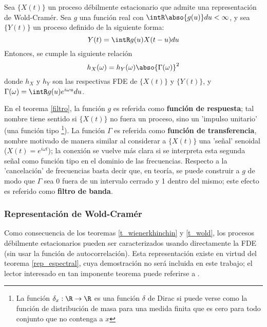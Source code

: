 \begin{thrm}
Sea $\{ X(t) \}$ un proceso d\'ebilmente estacionario que admite una representaci\'on de 
Wold-Cram\'er. Sea $g$ una funci\'on real con $\intR \abso{g(u)} du < \infty$, y sea $\{ Y(t) \}$ 
un proceso definido de la siguiente forma:
\begin{equation*}
Y(t) = \intR g(u) X(t-u) du
\end{equation*}
Entonces, se cumple la siguiente relaci\'on
\begin{equation*}
h_X(\omega) = h_Y(\omega) \abso{\Gamma(\omega)}^{2}
\end{equation*}
donde $h_X$ y $h_Y$ son las respectivas FDE de $\{X(t)\}$ y $\{Y(t)\}$, y 
$\Gamma(\omega) = \intR g(u) e^{i \omega u} du$.
\label{filtro}
\end{thrm}

En el teorema \ref{filtro}, la funci\'on $g$ es referida como \textbf{funci\'on de respuesta}; tal 
nombre tiene sentido si $\{X(t)\}$ no fuera un proceso, sino un 'impulso unitario' (una funci\'on 
tipo \dirac \footnote{La funci\'on $\delta_x:\R\rightarrow \R$ es una funci\'on $\delta$ de Dirac 
si puede verse como la funci\'on de distribuci\'on de masa para una medida finita que es cero para 
todo conjunto que no contenga a $x$}).
La funci\'on $\Gamma$ es referida como \textbf{funci\'on de transferencia}, nombre motivado de 
manera similar al considerar a $\{X(t)\}$ una 'se\~nal' senoidal ($X(t) = e^{i \omega t}$); la 
conexi\'on se vuelve m\'as clara si se interpreta esta segunda se\~nal como funci\'on tipo \dirac 
en el dominio de las frecuencias.
Respecto a la 'cancelaci\'on' de frecuencias basta decir que, en teor\'ia, se puede construir a $g$ 
de modo que $\Gamma$ sea 0 fuera de un intervalo cerrado y 1 dentro del mismo; este efecto es 
referido como \textbf{filtro de banda}.


\subsubsection{Representaci\'on de Wold-Cram\'er}

Como consecuencia de los teoremas \ref{t_wienerkhinchin} y \ref{t_wold}, los procesos d\'ebilmente 
estacionarios pueden ser caracterizados usando directamente la FDE (sin usar la funci\'on de
autocorrelaci\'on).
Esta representaci\'on existe en virtud del teorema \ref{rep_espectral}, cuya demostraci\'on no 
ser\'a incluida en este trabajo; el lector interesado en tan imponente teorema puede referirse a 
\cite{Priestley81}.

